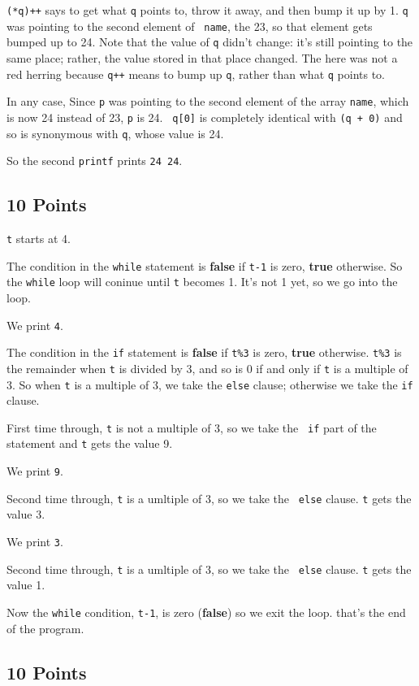 {\tt (*q)++} says to get what {\tt q} points to, throw it away, and then
bump it up by 1.  {\tt q} was pointing to the second element of {\tt
name}, the 23, so that element gets bumped up to 24.  Note that the
value of {\tt q} didn't change: it's still pointing to the same place;
rather, the value stored in that place changed.  The {\tt *} here was
not a red herring because {\tt q++} means to bump up {\tt q}, rather
than what {\tt q} points to.

In any case, Since {\tt p} was pointing to the second element of the
array {\tt name}, which is now 24 instead of 23, {\tt *p} is 24.  {\tt
q[0]} is completely identical with {\tt *(q + 0)} and so is synonymous
with {\tt *q}, whose value is 24.  

So the second {\tt printf} prints {\tt 24 24}.

\subsection{10 Points}

{\tt t} starts at 4.  

The condition in the {\tt while} statement is {\bf false} if {\tt t-1}
is zero, {\bf true} otherwise.  So the {\tt while} loop will coninue
until {\tt t} becomes 1.  It's not 1 yet, so we go into the loop.

We print {\tt 4}.

The condition in the {\tt if} statement is {\bf false} if {\tt t\%3} is
zero, {\bf true} otherwise.  {\tt t\%3} is the remainder when {\tt t} is
divided by 3, and so is 0 if and only if {\tt t} is a multiple of 3.  So
when {\tt t} is a multiple of 3, we take the {\tt else} clause;
otherwise we take the {\tt if} clause.

First time through, {\tt t} is not a multiple of 3, so we take the {\tt
if} part of the statement and {\tt t} gets the value 9.  

We print {\tt 9}.

Second time through, {\tt t} is a umltiple of 3, so we take the {\tt
else} clause.  {\tt t} gets the value 3.

We print {\tt 3}.

Second time through, {\tt t} is a umltiple of 3, so we take the {\tt
else} clause.  {\tt t} gets the value 1.

Now the {\tt while} condition, {\tt t-1}, is zero ({\bf false}) so we
exit the loop. that's the end of the program.

\subsection{10 Points}

